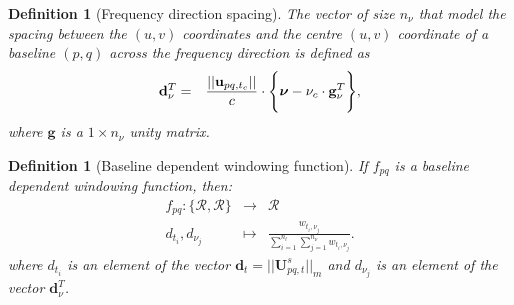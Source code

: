 \documentclass[useAMS,usenatbib]{mn2e}
\newtheorem{definition}[theorem]{Definition}
\begin{document}
\begin{definition}[Frequency direction spacing]
\label{def:2}
The vector of size $n_{\nu}$ that model the spacing between the $(u,v)$ coordinates and the centre $(u,v)$ coordinate of a baseline $(p,q)$ 
across the frequency direction is defined as
\begin{eqnarray*}
\mathbf{d}^{T}_{\nu} &=&\frac{||\textbf{u}_{pq,t_c}||}{c}\cdot\Bigg\{\mbox{\boldmath 
$\nu$}-\nu_c\cdot\mathbf{g}^T_{\nu} \Bigg \},
\end{eqnarray*}
where  $\textbf{g}$ is a $1\times n_{\nu}$ unity matrix.
\end{definition}
\begin{definition}[Baseline dependent windowing function]
\label{def:3}
If $f_{pq}$ is a \textit{baseline dependent windowing function}, then:
\begin{eqnarray*}
 f_{pq}: \{\mathbf{\mathcal{R}},\mathbf{\mathcal{R}}\} &\rightarrow& \mathbf{\mathcal{R}}\\
                   d_{t_i},d_{\nu_j} &\mapsto& \frac{w_{t_i,\nu_j}}{\sum_{i=1}^{n_t}\sum_{j=1}^{n_{\nu}}w_{t_i,\nu_j}}.
\end{eqnarray*}
where $d_{t_i}$ is an element of the vector $\mathbf{d}_{t}=||\mathbf{U}_{pq,t}^{s}||_{m}$ and $d_{\nu_j}$ is an element of the vector 
$\mathbf{d}^{T}_{\nu}$.
\end{definition}
\end{document}
